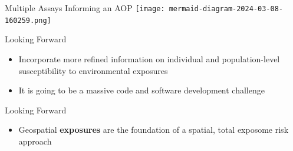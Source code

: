 \documentclass[
  ignorenonframetext,
]{beamer}
\providecommand{\tightlist}{%
  \setlength{\itemsep}{0pt}\setlength{\parskip}{0pt}}\usepackage{longtable,booktabs,array}
\begin{document}
\begin{frame}{Multiple Assays Informing an AOP}
\label{multiple-assays-informing-an-aop}
\texttt{[image: mermaid-diagram-2024-03-08-160259.png]}
\end{frame}

\begin{frame}{Looking Forward}
\label{looking-forward-1}
\begin{itemize}
\item
  Incorporate more refined information on individual and
  population-level susceptibility to environmental exposures
\item
  It is going to be a massive code and software development challenge
\end{itemize}
\end{frame}

\begin{frame}{Looking Forward}
\label{looking-forward-2}
\begin{itemize}
\tightlist
\item
  Geospatial \textbf{exposures} are the foundation of a spatial, total
  exposome risk approach
\end{itemize}
\end{frame}
\end{document}
